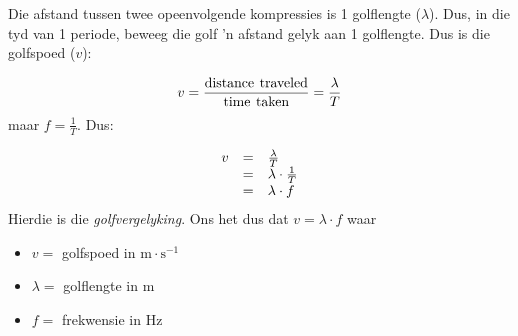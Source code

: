    
        \label{m38806*id319706}Die afstand tussen twee opeenvolgende kompressies is 1 golflengte ($\lambda$). Dus, in die tyd van 1 periode, beweeg die golf 'n afstand gelyk aan 1 golflengte. Dus is die golfspoed ($v$):\par 
        \label{m38806*id319732}\nopagebreak\noindent{}
    \begin{equation}
    v=\frac{\text{distance}\phantom{\rule{4.pt}{0ex}}\text{traveled}}{\text{time}\phantom{\rule{4.pt}{0ex}}\text{taken}}=\frac{\lambda }{T}
      \end{equation}
        \label{m38806*id319776}maar $f=\frac{1}{T}$. Dus:\par 
        \label{m38806*id319802}\nopagebreak\noindent{}
          
    \begin{equation}
    \begin{array}{ccc}\hfill v& =& \frac{\lambda }{T}\hfill \\ & =& \lambda \ensuremath{\cdot}\frac{1}{T}\hfill \\ & =& \lambda \ensuremath{\cdot}f\hfill \end{array}
      \end{equation}
        \label{m38806*id319870}Hierdie is die \textsl{golfvergelyking}. Ons het dus dat $v=\lambda \ensuremath{\cdot}f$ waar\par 
        \label{m38806*id319901}\begin{itemize}[noitemsep]
            \label{m38806*uid22}\item $v=$ golfspoed in $\text{m}\ensuremath{\cdot}\text{s}{}^{-1}$\label{m38806*uid23}\item $\lambda =$ golflengte in $\text{m}$
\item $f=$ frekwensie in $\text{Hz}$
\end{itemize}
\par

